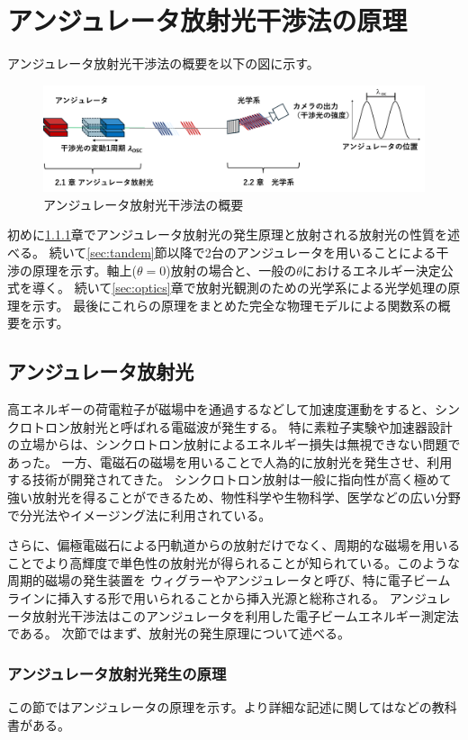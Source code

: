 \documentclass[a4paper,11pt,uplatex]{jsbook}
\begin{document}
\chapter{アンジュレータ放射光干渉法の原理}
アンジュレータ放射光干渉法の概要を以下の図に示す。
\begin{figure}[h]
  \centering
  \includegraphics[width=\linewidth]{image/2-URI.png}
  \caption{アンジュレータ放射光干渉法の概要}
\end{figure}

初めに\ref{sec:undulator}章でアンジュレータ放射光の発生原理と放射される放射光の性質を述べる。
続いて\ref{sec:tandem}節以降で2台のアンジュレータを用いることによる干渉の原理を示す。軸上($\theta =0$)放射の場合と、一般の$\theta$におけるエネルギー決定公式を導く。
続いて\ref{sec:optics}章で放射光観測のための光学系による光学処理の原理を示す。
最後にこれらの原理をまとめた完全な物理モデルによる関数系の概要を示す。
\section{アンジュレータ放射光}
高エネルギーの荷電粒子が磁場中を通過するなどして加速度運動をすると、シンクロトロン放射光と呼ばれる電磁波が発生する。
特に素粒子実験や加速器設計の立場からは、シンクロトロン放射によるエネルギー損失は無視できない問題であった。
一方、電磁石の磁場を用いることで人為的に放射光を発生させ、利用する技術が開発されてきた。
シンクロトロン放射は一般に指向性が高く極めて強い放射光を得ることができるため、物性科学や生物科学、医学などの広い分野で分光法やイメージング法に利用されている。

さらに、偏極電磁石による円軌道からの放射だけでなく、周期的な磁場を用いることでより高輝度で単色性の放射光が得られることが知られている。このような周期的磁場の発生装置を
ウィグラーやアンジュレータと呼び、特に電子ビームラインに挿入する形で用いられることから挿入光源と総称される。
アンジュレータ放射光干渉法はこのアンジュレータを利用した電子ビームエネルギー測定法である。
次節ではまず、放射光の発生原理について述べる。

\subsection{アンジュレータ放射光発生の原理}\label{sec:undulator}
この節ではアンジュレータの原理を示す。より詳細な記述に関しては\cite{大柳,walker,clarke}などの教科書がある。
\end{document}
